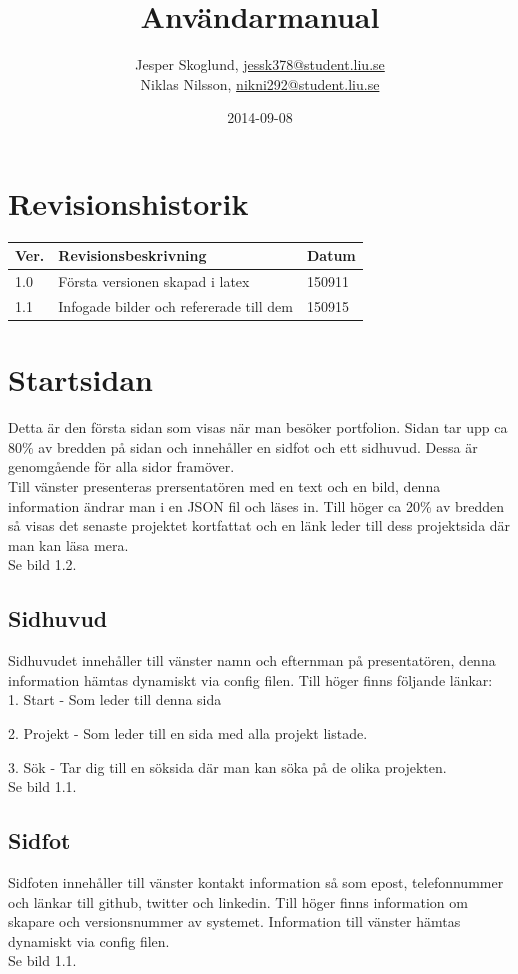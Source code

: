\documentclass{TDP003mall}
\author{Jesper Skoglund, \url{jessk378@student.liu.se}\\
  Niklas Nilsson, \url{nikni292@student.liu.se}}
\title{Användarmanual}
\date{2014-09-08}
\begin{document}
\projectpage
\section{Revisionshistorik}
\begin{table}[!h]
\begin{tabularx}{\linewidth}{|l|X|l|}
\hline
Ver. & Revisionsbeskrivning & Datum \\\hline
1.0 & Första versionen skapad i latex & 150911 \\\hline
1.1 & Infogade bilder och refererade till dem & 150915 \\\hline
\end{tabularx}
\end{table}


\section{Startsidan}
Detta är den första sidan som visas när man besöker portfolion. Sidan tar upp ca 80\% av bredden på sidan och innehåller en sidfot och ett sidhuvud. 
Dessa är genomgående för alla sidor framöver. \\
Till vänster presenteras prersentatören med en text och en bild, denna information ändrar man i en JSON fil och läses in. Till höger ca 20\% av bredden 
så visas det senaste projektet kortfattat och en länk leder till dess projektsida där man kan läsa mera. \\
Se bild 1.2.

\subsection{Sidhuvud}
Sidhuvudet innehåller till vänster namn och efternman på presentatören, denna information hämtas dynamiskt via config filen. Till höger finns följande länkar: \\

1. Start - Som leder till denna sida 

2. Projekt - Som leder till en sida med alla projekt listade.
 
3. Sök - Tar dig till en söksida där man kan söka på de olika projekten. \\
Se bild 1.1.

\subsection{Sidfot}
Sidfoten innehåller till vänster kontakt information så som epost, telefonnummer och länkar till github, twitter och linkedin. Till höger finns information om skapare och versionsnummer av systemet. Information till vänster hämtas dynamiskt via config filen. \\
Se bild 1.1.
\end{document}
